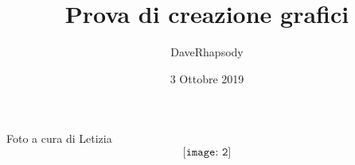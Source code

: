 \documentclass[12pt, a4paper, openany, twoside]{book}
\begin{document}
\pagestyle{plain}
\author{DaveRhapsody}
\title{Prova di creazione grafici}
\date{3 Ottobre 2019}
\maketitle
\tableofcontents

Foto a cura di Letizia \\
$$\texttt{[image: 2]}$$
\end{document}
